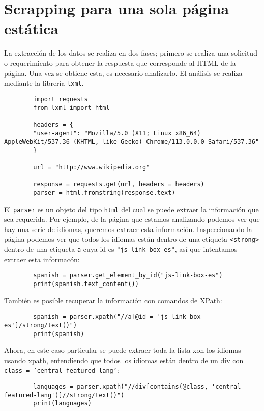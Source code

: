         
    \section{Scrapping para una sola página estática}

    La extracción de los datos se realiza en dos fases; primero se realiza una solicitud o requerimiento para obtener la respuesta que corresponde al HTML de la página. Una vez se obtiene esta, es necesario analizarlo. El análisis se realiza mediante la librería \texttt{lxml}.

    \begin{verbatim}
        import requests
        from lxml import html

        headers = {
        "user-agent": "Mozilla/5.0 (X11; Linux x86_64) AppleWebKit/537.36 (KHTML, like Gecko) Chrome/113.0.0.0 Safari/537.36"
        }

        url = "http://www.wikipedia.org"

        response = requests.get(url, headers = headers)
        parser = html.fromstring(response.text)
    \end{verbatim}

    El \texttt{parser} es un objeto del tipo \texttt{html} del cual se puede extraer la información que sea requerida. Por ejemplo, de la página que estamos analizando podemos ver que hay una serie de idiomas, queremos extraer esta información. Inspeccionando la página podemos ver que todos los idiomas están dentro de una etiqueta \texttt{<strong>} dentro de una etiqueta \texttt{a} cuya id es \texttt{"js-link-box-es"}, así que intentamos extraer esta informacón:

    \begin{verbatim}
        spanish = parser.get_element_by_id("js-link-box-es")
        print(spanish.text_content())
    \end{verbatim}

    También es posible recuperar la información con comandos de XPath:

    \begin{verbatim}
        spanish = parser.xpath("//a[@id = 'js-link-box-es']/strong/text()")
        print(spanish)
    \end{verbatim}

    Ahora, en este caso particular se puede extraer toda la lista xon los idiomas usando xpath, entendiendo que todos los idiomas están dentro de un div con \texttt{class = 'central-featured-lang'}:

    \begin{verbatim}
        languages = parser.xpath("//div[contains(@class, 'central-featured-lang')]//strong/text()")
        print(languages)
    \end{verbatim}
 